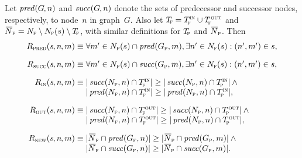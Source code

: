 \begin{definition}
  \def\fT{T_{\!\mathsc{f}}}%
  \def\pT{T_{\!\mathsc{p}}}%
  \def\fNegN{\mkern2mu\overline{\mkern-2mu N}_{\mathsc{f}}}%
  \def\pNegN{\mkern2mu\overline{\mkern-2mu N}_{\mathsc{p}}}%

  Let $\operatorname{\textrm{\textit{pred}}}(G\hspace{-.8pt}, n)$ and $\operatorname{\textrm{\textit{succ}}}(G\hspace{-.8pt}, n)$ denote the
  sets of predecessor and successor \glspl{node}, respectively, to
  \gls{node}~$n$ in \gls{graph}~$G$.
  Also let \mbox{$\fT = \fTin \cup \fTout$} and \mbox{$\fNegN = \fN \setminus
    \fN(s) \setminus \fT$}, with similar definitions for $\pT$ and $\pNegN$.
  Then
  \begin{displaymath}
    \begin{array}{r@{}l}
        \mSynPredRule(s\hspace{-.8pt}, n\hspace{-.8pt}, m) \equiv \mbox{}
      & \forall m' \in \pN(s) \cap \mPred(\pG, m),
        \exists n' \in \fN(s) :
        \mPair{n'}{m'} \in s, \\[\abovedisplayskip]

        \mSynSuccRule(s\hspace{-.8pt}, n\hspace{-.8pt}, m) \equiv \mbox{}
      & \forall m' \in \pN(s) \cap \mSucc(\pG, m),
        \exists n' \in \fN(s) :
        \mPair{n'}{m'} \in s, \\[\abovedisplayskip]

        \mSynInRule(s\hspace{-.8pt}, n\hspace{-.8pt}, m) \equiv \mbox{}
      & \mCard{\mSucc(\fN, n) \cap \fTin} \geq
        \mCard{\mSucc(\pN, n) \cap \pTin} \mAnd \mbox{} \\
      & \mCard{\mPred(\fN, n) \cap \fTin} \geq
        \mCard{\mPred(\pN, n) \cap \pTin}, \\[\abovedisplayskip]

        \mSynOutRule(s\hspace{-.8pt}, n\hspace{-.8pt}, m) \equiv \mbox{}
      & \mCard{\mSucc(\fN, n) \cap \fTout} \geq
        \mCard{\mSucc(\pN, n) \cap \pTout} \mAnd \mbox{} \\
      & \mCard{\mPred(\fN, n) \cap \fTout} \geq
        \mCard{\mPred(\pN, n) \cap \pTout}, \\[\abovedisplayskip]

        \mSynNewRule(s\hspace{-.8pt}, n\hspace{-.8pt}, m) \equiv \mbox{}
      & \mCard{\fNegN \cap \mPred(\fG, n)} \geq
        \mCard{\pNegN \cap \mPred(\pG, m)} \mAnd \mbox{} \\
      & \mCard{\fNegN \cap \mSucc(\fG, n)} \geq
        \mCard{\pNegN \cap \mSucc(\pG, m)}.
    \end{array}
  \end{displaymath}%
\end{definition}


